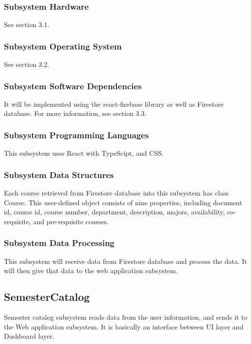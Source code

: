 \subsubsection{Subsystem Hardware}
See section 3.1.

\subsubsection{Subsystem Operating System}
See section 3.2.

\subsubsection{Subsystem Software Dependencies}
It will be implemented using the react-firebase library as well as Firestore database. For more information, see section 3.3.

\subsubsection{Subsystem Programming Languages}
This subsystem uses React with TypeScipt, and CSS.

\subsubsection{Subsystem Data Structures}
Each course retrieved from Firestore database into this subsystem has class Course. This user-defined object consists of nine properties, including document id, course id, course number, department, description, majors, availability, co-requisite, and pre-requisite courses. 

\subsubsection{Subsystem Data Processing}
This subsystem will receive data from Firestore database and process the data. It will then give that data to the web application subsystem. 

\subsection{SemesterCatalog}
Semester catalog subsystem reads data from the user information, and sends it to the Web application subsystem. It is basically an interface between UI layer and Dashboard layer. 

